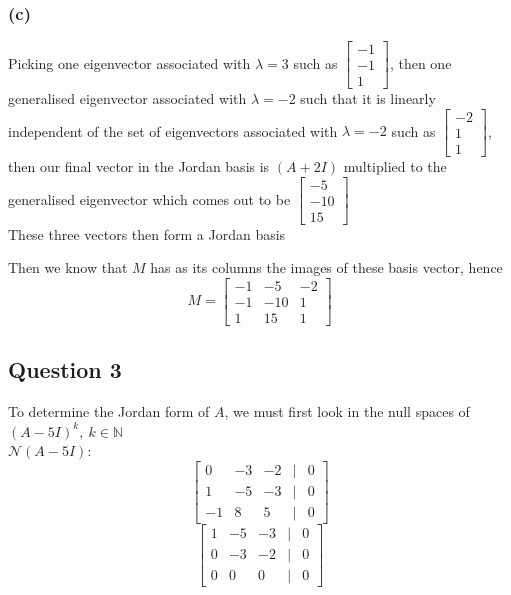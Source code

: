 \documentclass{article}
\begin{document}
\subsubsection*{(c)} 
Picking one eigenvector associated with \(\lambda = 3\) such as \(\begin{bmatrix}
    -1 \\ -1 \\ 1
\end{bmatrix}\), 
then one generalised eigenvector associated with \(\lambda = - 2\)
such that it is linearly independent of the set of eigenvectors associated with \(\lambda = -2\) 
such as \(\begin{bmatrix}
    -2 \\ 1 \\ 1
\end{bmatrix}\), then our final vector in the Jordan basis is \((A + 2I)\) multiplied to the generalised eigenvector
which comes out to be \(\begin{bmatrix}
    -5 \\ -10 \\ 15
\end{bmatrix}\)
\\

These three vectors then form a Jordan basis

Then we know that \(M\) has as its columns the images of these basis vector, hence
\[
M = \begin{bmatrix}
    -1 & -5 & -2 \\
    -1 & -10 & 1 \\
    1 & 15 & 1
\end{bmatrix}
\]


\subsection*{Question 3}
To determine the Jordan form of \(A\), we must first look in the null spaces of 
\((A - 5I)^k, \ k \in \mathbb{N}\)
\\

\(\mathcal{N}(A - 5I)\):
\[
\begin{bmatrix}
    0 & -3 & -2 & | & 0 \\
    1 & -5 & -3 & | & 0 \\
    -1 & 8 & 5 & | & 0 
\end{bmatrix}
\]
\[
\begin{bmatrix}
    1 & -5 & -3 & | & 0 \\
    0 & -3 & -2 & | & 0 \\
    0 & 0 & 0 & | & 0 
\end{bmatrix}
\]
\end{document}
